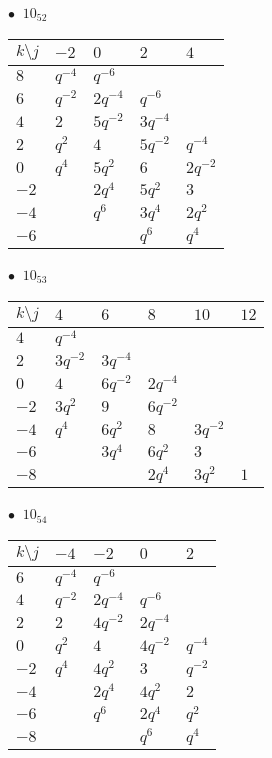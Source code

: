 \begin{minipage}{\linewidth}
$\bullet\ $ $10_{52}$ \vspace{0.5em} \\
\begin{tabular}{l|llll}
$k \setminus j$ & $-2$ & $0$ & $2$ & $4$ \\
\hline
$8$ & $q^{-4}$ & $q^{-6}$ &  &  \\
$6$ & $q^{-2}$ & $2q^{-4}$ & $q^{-6}$ &  \\
$4$ & $2$ & $5q^{-2}$ & $3q^{-4}$ &  \\
$2$ & $q^{2}$ & $4$ & $5q^{-2}$ & $q^{-4}$ \\
$0$ & $q^{4}$ & $5q^{2}$ & $6$ & $2q^{-2}$ \\
$-2$ &  & $2q^{4}$ & $5q^{2}$ & $3$ \\
$-4$ &  & $q^{6}$ & $3q^{4}$ & $2q^{2}$ \\
$-6$ &  &  & $q^{6}$ & $q^{4}$ \\
\end{tabular}
\vspace{2em}
\end{minipage}
%
\begin{minipage}{\linewidth}
$\bullet\ $ $10_{53}$ \vspace{0.5em} \\
\begin{tabular}{l|lllll}
$k \setminus j$ & $4$ & $6$ & $8$ & $10$ & $12$ \\
\hline
$4$ & $q^{-4}$ &  &  &  &  \\
$2$ & $3q^{-2}$ & $3q^{-4}$ &  &  &  \\
$0$ & $4$ & $6q^{-2}$ & $2q^{-4}$ &  &  \\
$-2$ & $3q^{2}$ & $9$ & $6q^{-2}$ &  &  \\
$-4$ & $q^{4}$ & $6q^{2}$ & $8$ & $3q^{-2}$ &  \\
$-6$ &  & $3q^{4}$ & $6q^{2}$ & $3$ &  \\
$-8$ &  &  & $2q^{4}$ & $3q^{2}$ & $1$ \\
\end{tabular}
\vspace{2em}
\end{minipage}
%
\begin{minipage}{\linewidth}
$\bullet\ $ $10_{54}$ \vspace{0.5em} \\
\begin{tabular}{l|llll}
$k \setminus j$ & $-4$ & $-2$ & $0$ & $2$ \\
\hline
$6$ & $q^{-4}$ & $q^{-6}$ &  &  \\
$4$ & $q^{-2}$ & $2q^{-4}$ & $q^{-6}$ &  \\
$2$ & $2$ & $4q^{-2}$ & $2q^{-4}$ &  \\
$0$ & $q^{2}$ & $4$ & $4q^{-2}$ & $q^{-4}$ \\
$-2$ & $q^{4}$ & $4q^{2}$ & $3$ & $q^{-2}$ \\
$-4$ &  & $2q^{4}$ & $4q^{2}$ & $2$ \\
$-6$ &  & $q^{6}$ & $2q^{4}$ & $q^{2}$ \\
$-8$ &  &  & $q^{6}$ & $q^{4}$ \\
\end{tabular}
\vspace{2em}
\end{minipage}

